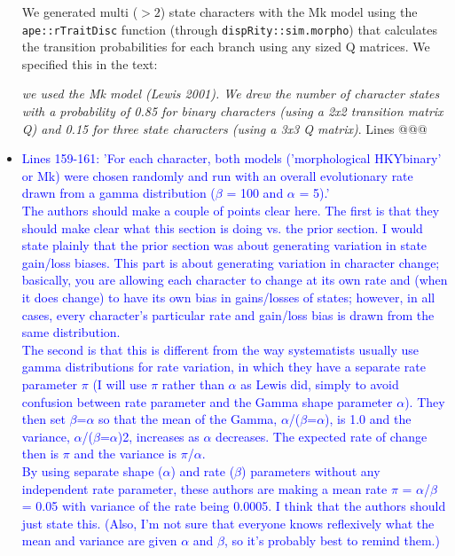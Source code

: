 \documentclass[12pt,letterpaper]{article}
\begin{document}
\begin{itemize}
We generated multi ($>2$) state characters with the Mk model using the \texttt{ape::rTraitDisc} function (through \texttt{dispRity::sim.morpho}) that calculates the transition probabilities for each branch using any sized Q matrices. We specified this in the text:

\textit{we used the Mk model (Lewis 2001). We drew the number of character states with a probability of 0.85 for binary characters (using a 2x2 transition matrix Q) and 0.15 for three state characters (using a 3x3 Q matrix)}. Lines @@@



\item{\textcolor{blue}{Lines 159-161: 'For each character, both models ('morphological HKYbinary' or Mk) were chosen randomly and run with an overall evolutionary rate drawn from a gamma distribution ($\beta$ = 100 and $\alpha$ = 5).'
\\
The authors should make a couple of points clear here. The first is that they should make clear what this section is doing vs. the prior section. I would state plainly that the prior section was about generating variation in state gain/loss biases. This part is about generating variation in character change; basically, you are allowing each character to change at its own rate and (when it does change) to have its own bias in gains/losses of states; however, in all cases, every character's particular rate and gain/loss bias is drawn from the same distribution.
\\
The second is that this is different from the way systematists usually use gamma distributions for rate variation, in which they have a separate rate parameter $\pi$ (I will use $\pi$ rather than $\alpha$ as Lewis did, simply to avoid confusion between rate parameter and the Gamma shape parameter $\alpha$). They then set $\beta$=$\alpha$ so that the mean of the Gamma, $\alpha$/($\beta$=$\alpha$), is 1.0 and the variance, $\alpha$/($\beta$=$\alpha$)2, increases as $\alpha$ decreases. The expected rate of change then is $\pi$ and the variance is $\pi$/$\alpha$.
\\
By using separate shape ($\alpha$) and rate ($\beta$) parameters without any independent rate parameter, these authors are making a mean rate $\pi$ = $\alpha$/$\beta$ = 0.05 with variance of the rate being 0.0005. I think that the authors should just state this. (Also, I'm not sure that everyone knows reflexively what the mean and variance are given $\alpha$ and $\beta$, so it's probably best to remind them.)}}


\end{itemize}
\end{document}
